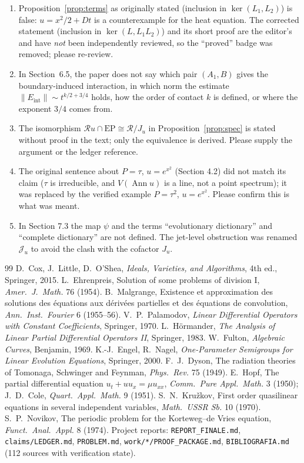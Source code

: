 \documentclass[11pt,a4paper]{article}
\theoremstyle{definition}
\newcommand{\Ann}{\operatorname{Ann}}
\newcommand{\EP}{\mathrm{EP}}
\newcommand{\Eint}{E_{\mathrm{int}}}
\newcommand{\ring}{\mathcal{R}}
\newcommand{\Var}{V}
\begin{document}
\begin{enumerate}[label=\textbf{E\arabic*.},leftmargin=1.1cm]
\item Proposition~\ref{prop:terms} as originally stated (inclusion in $\ker(L_1,L_2)$) is false: $u=x^2/2+Dt$ is a counterexample for the heat equation. The corrected statement (inclusion in $\ker(L,L_1L_2)$) and its short proof are the editor's and have \emph{not} been independently reviewed, so the ``proved'' badge was removed; please re-review.
\item In Section~6.5, the paper does not say which pair $(A_1,B)$ gives the boundary-induced interaction, in which norm the estimate $\|\Eint\|\sim t^{k/2+3/4}$ holds, how the order of contact $k$ is defined, or where the exponent $3/4$ comes from.
\item The isomorphism $\ring u\cap\EP\cong\ring/J_u$ in Proposition~\ref{prop:spec} is stated without proof in the text; only the equivalence is derived. Please supply the argument or the ledger reference.
\item The original sentence about $P=\tau$, $u=e^{x^2}$ (Section 4.2) did not match its claim ($\tau$ is irreducible, and $\Var(\Ann u)$ is a line, not a point spectrum); it was replaced by the verified example $P=\tau^2$, $u=e^{x^2}$. Please confirm this is what was meant.
\item In Section 7.3 the map $\psi$ and the terms ``evolutionary dictionary'' and ``complete dictionary'' are not defined. The jet-level obstruction was renamed $\mathcal J_u$ to avoid the clash with the cofactor $J_u$.
\end{enumerate}

\bigskip
\begin{thebibliography}{99}\small
{} D.~Cox, J.~Little, D.~O'Shea, \emph{Ideals, Varieties, and Algorithms}, 4th ed., Springer, 2015.
 L.~Ehrenpreis, Solution of some problems of division I, \emph{Amer.\ J.\ Math.} 76 (1954).
 B.~Malgrange, Existence et approximation des solutions des \'equations aux d\'eriv\'ees partielles et des \'equations de convolution, \emph{Ann.\ Inst.\ Fourier} 6 (1955--56).
 V.~P.~Palamodov, \emph{Linear Differential Operators with Constant Coefficients}, Springer, 1970.
 L.~H\"ormander, \emph{The Analysis of Linear Partial Differential Operators II}, Springer, 1983.
 W.~Fulton, \emph{Algebraic Curves}, Benjamin, 1969.
 K.-J.~Engel, R.~Nagel, \emph{One-Parameter Semigroups for Linear Evolution Equations}, Springer, 2000.
 F.~J.~Dyson, The radiation theories of Tomonaga, Schwinger and Feynman, \emph{Phys.\ Rev.} 75 (1949).
 E.~Hopf, The partial differential equation $u_t+uu_x=\mu u_{xx}$, \emph{Comm.\ Pure Appl.\ Math.} 3 (1950); J.~D.~Cole, \emph{Quart.\ Appl.\ Math.} 9 (1951).
 S.~N.~Kru\v zkov, First order quasilinear equations in several independent variables, \emph{Math.\ USSR Sb.} 10 (1970).
 S.~P.~Novikov, The periodic problem for the Korteweg--de Vries equation, \emph{Funct.\ Anal.\ Appl.} 8 (1974).
 Project reports: \texttt{REPORT\_FINALE.md}, \texttt{claims/LEDGER.md}, \texttt{PROBLEM.md}, \texttt{work/*/PROOF\_PACKAGE.md}, \texttt{BIBLIOGRAFIA.md} (112 sources with verification state).
\end{thebibliography}
\end{document}
